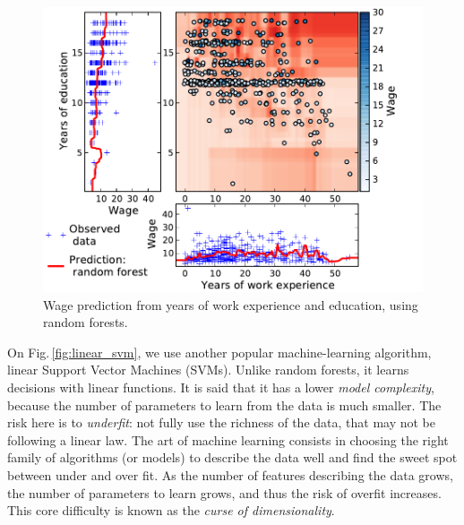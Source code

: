 \documentclass[a4paper]{article}
\begin{document}
\begin{figure}[b]
    \includegraphics[width=1.05\linewidth]{wage_data_random_forest}%

    \caption{Wage prediction from years of work experience and education,
    using random forests.\label{fig:random_forest}}
\end{figure}


On Fig.\,\ref{fig:linear_svm}, we use another popular machine-learning
algorithm, linear Support Vector Machines (SVMs). Unlike random forests,
it learns decisions with linear functions. It is said that
it has a lower \emph{model complexity}, because the number of parameters
to learn from the data is much smaller. The risk here is to
\emph{underfit}: not fully use the richness of the data, that may not be
following a linear law. The art of machine learning consists in choosing
the right family of algorithms (or models) to describe the data well and
find the sweet spot between under and over fit. As the number of features
describing the data grows, the number of parameters to learn grows, and
thus the risk of overfit increases. This core difficulty is known as the
\emph{curse of dimensionality}.
\end{document}

